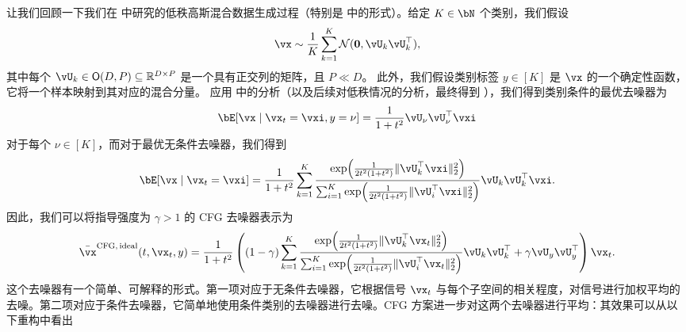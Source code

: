 \documentclass[../../book-main.tex]{subfiles}
\begin{document}
\begin{example}\label{example:denoising-gaussian-mixture-cfg}
  让我们回顾一下我们在  中研究的低秩高斯混合数据生成过程（特别是  中的形式）。给定 $K \in \bN$ 个类别，我们假设
  \begin{equation}\label{eq:MoG1-ch6}
    \vx \sim \frac{1}{K}\sum_{k = 1}^{K}\dNorm(\vzero, \vU_{k}\vU_{k}^{\top}),
  \end{equation}
  其中每个 \(\vU_{k} \in \O(D, P) \subseteq \R^{D \times P}\) 是一个具有正交列的矩阵，且 $P \ll D$。
  此外，我们假设类别标签 $y \in [K]$ 是 $\vx$ 的一个确定性函数，它将一个样本映射到其对应的混合分量。
  应用  中的分析（以及后续对低秩情况的分析，最终得到 ），我们得到类别条件的最优去噪器为
  \begin{equation}\label{eq:gmm_lowrank_denoiser-ch6-classcond}
    \bE[ \vx \mid \vx_t = \vxi, y = \nu ]
    = \frac{1}{1 + t^{2}}
    \vU_{\nu}\vU_{\nu}^{\top}\vxi
  \end{equation}
  对于每个 $\nu \in [K]$，而对于最优无条件去噪器，我们得到
  \begin{equation}\label{eq:gmm_lowrank_denoiser-ch6-uncond}
    \bE[ \vx \mid \vx_t = \vxi ]
    = \frac{1}{1 + t^{2}}\sum_{k = 1}^{K}\frac{\exp\rp{\frac{1}{2t^{2}(1 + t^{2})}\norm{\vU_{k}^{\top}\vxi}_{2}^{2}}}{\sum_{i = 1}^{K}\exp\rp{\frac{1}{2t^{2}(1 + t^{2})}\norm{\vU_{i}^{\top}\vxi}_{2}^{2}}}\vU_{k}\vU_{k}^{\top}\vxi.
  \end{equation}
  因此，我们可以将指导强度为 $\gamma > 1$ 的 CFG 去噪器表示为
  \begin{equation}\label{eq:cfg-denoiser-mog-low-rank}
    \bar{\vx}^{\mathrm{CFG,\,ideal}}(t, \vx_t, y)
    =
    \frac{1}{1 + t^{2}}
    \left(
    (1 - \gamma) 
    \sum_{k = 1}^{K}\frac{\exp\rp{\frac{1}{2t^{2}(1
    + t^{2})}\norm{\vU_{k}^{\top}\vx_t}_{2}^{2}}}{\sum_{i
    = 1}^{K}\exp\rp{\frac{1}{2t^{2}(1
    + t^{2})}\norm{\vU_{i}^{\top}\vx_t}_{2}^{2}}}\vU_{k}\vU_{k}^{\top}
    +
    \gamma 
    \vU_{y}\vU_{y}^{\top}
    \right)
    \vx_t.
  \end{equation}
  这个去噪器有一个简单、可解释的形式。第一项对应于无条件去噪器，它根据信号 $\vx_t$ 与每个子空间的相关程度，对信号进行加权平均的去噪。第二项对应于条件去噪器，它简单地使用条件类别的去噪器进行去噪。CFG 方案进一步对这两个去噪器进行平均：其效果可以从以下重构中看出
  \begin{equation}\label{eq:cfg-denoiser-mog-low-rank-2}

\end{equation}
\end{example}
\end{document}
